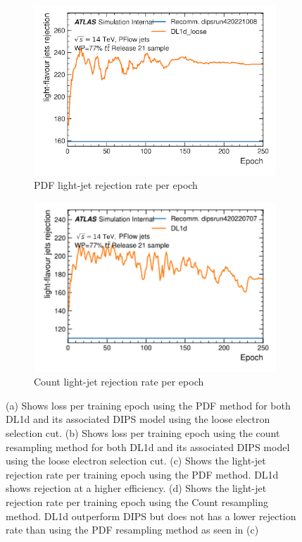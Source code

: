 \begin{figure}[H]
\begin{subfigure}{0.45\textwidth}
        \includegraphics[width=\textwidth]{figs/ch5/rejvepoch_pdf.png}
        \caption{PDF light-jet rejection rate per epoch}
        \label{fig:vepochc}
    \end{subfigure}
    \begin{subfigure}{0.45\textwidth}
        \centering
        \includegraphics[width=\textwidth]{figs/ch5/rejvepoch_count.png}
        \caption{Count light-jet rejection rate per epoch}
        \label{fig:vepochd}
    \end{subfigure}
    \caption{(a) Shows loss per training epoch using the PDF method for both DL1d and its associated DIPS model using the loose electron selection cut. 
    (b) Shows loss per training epoch using the count resampling method for both DL1d and its associated DIPS model using the loose electron selection cut.
    (c) Shows the light-jet rejection rate per training epoch using the PDF method. DL1d shows rejection at a higher efficiency. 
    (d) Shows the light-jet rejection rate per training epoch using the Count resampling method. DL1d outperform DIPS but does not has a lower rejection rate than using the PDF resampling method as seen in (c)}
    \label{fig:vepoch}
\end{figure}


